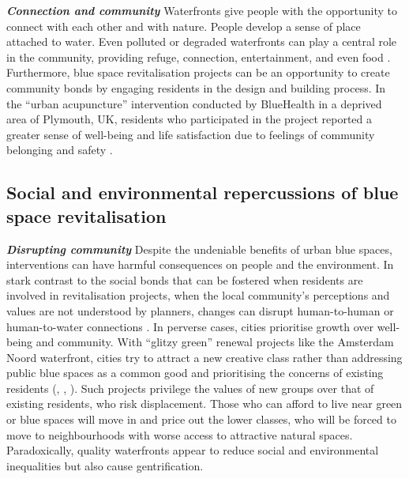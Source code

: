 \documentclass{article}
\newcommand{\bisection}[1]{\textbf{\textit{#1}}}
\begin{document}
\bisection{Connection and community}
Waterfronts give people with the opportunity to connect with each other and with nature. People develop a sense of place attached to water. Even polluted or degraded waterfronts can play a central role in the community, providing refuge, connection, entertainment, and even food \parencite{toomey2021place}. 
Furthermore, blue space revitalisation projects can be an opportunity to create community bonds by engaging residents in the design and building process. In the ``urban acupuncture'' intervention conducted by BlueHealth in a deprived area of Plymouth, UK, residents who participated in the project reported a greater sense of well-being and life satisfaction due to feelings of community belonging and safety \parencite{van2021urban}.

\subsection{Social and environmental repercussions of blue space revitalisation}

\bisection{Disrupting community}
Despite the undeniable benefits of urban blue spaces, interventions can have harmful consequences on people and the environment.
In stark contrast to the social bonds that can be fostered when residents are involved in revitalisation projects, when the local community's perceptions and values are not understood by planners, changes can disrupt human-to-human or human-to-water connections \parencite{toomey2021place}. In perverse cases, cities prioritise growth over well-being and community. With ``glitzy green'' \parencite{anguelovski2021green} renewal projects like the Amsterdam Noord waterfront, cities try to attract a new creative class rather than addressing public blue spaces as a common good and prioritising the concerns of existing residents (\cite{wessells2014urban}, \cite{anguelovski2020expanding}, \cite{del2021dismantling}).
Such projects privilege the values of new groups over that of existing residents, who risk displacement. Those who can afford to live near green or blue spaces will move in and price out the lower classes, who will be forced to move to neighbourhoods with worse access to attractive natural spaces. 
Paradoxically, quality waterfronts appear to reduce social and environmental inequalities but also cause gentrification. 

\end{document}
